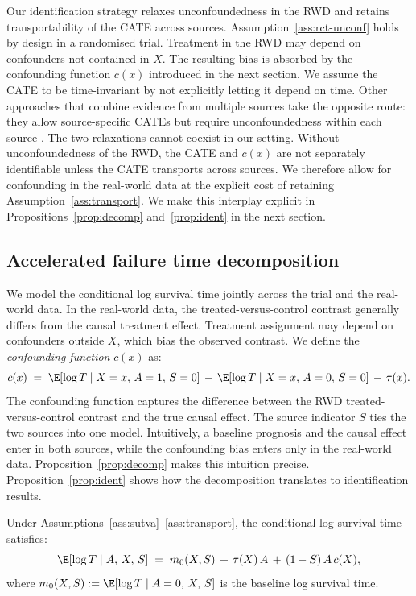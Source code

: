 Our identification strategy relaxes unconfoundedness in the RWD and retains transportability of the CATE across sources.
Assumption~\ref{ass:rct-unconf} holds by design in a randomised trial.
Treatment in the RWD may depend on confounders not contained in $X$.
The resulting bias is absorbed by the confounding function $c(x)$ introduced in the next section.
We assume the CATE to be time-invariant by not explicitly letting it depend on time.
Other approaches that combine evidence from multiple sources take the opposite route: they allow source-specific CATEs but require unconfoundedness within each source \citep{stuart2011propensity, dahabreh2019generalizing, shyr2025multistudy}.
The two relaxations cannot coexist in our setting.
Without unconfoundedness of the RWD, the CATE and $c(x)$ are not separately identifiable unless the CATE transports across sources.
We therefore allow for confounding in the real-world data at the explicit cost of retaining Assumption~\ref{ass:transport}.
We make this interplay explicit in Propositions~\ref{prop:decomp} and~\ref{prop:ident} in the next section.

\subsection{Accelerated failure time decomposition}

We model the conditional log survival time jointly across the trial and the real-world data.
In the real-world data, the treated-versus-control contrast generally differs from the causal treatment effect.
Treatment assignment may depend on confounders outside $X$, which bias the observed contrast.
We define the \emph{confounding function} $c(x)$ \citep{robins2000sensitivity} as:
\begin{equation}
c(x) \;=\; \E[\log T \mid X = x,\, A = 1,\, S = 0] \,-\, \E[\log T \mid X = x,\, A = 0,\, S = 0] \,-\, \tau(x).
\label{eq:cf}
\end{equation}
The confounding function captures the difference between the RWD treated-versus-control contrast and the true causal effect.
The source indicator $S$ ties the two sources into one model.
Intuitively, a baseline prognosis and the causal effect enter in both sources, while the confounding bias enters only in the real-world data.
Proposition~\ref{prop:decomp} makes this intuition precise.
Proposition~\ref{prop:ident} shows how the decomposition translates to identification results.
\begin{proposition}\label{prop:decomp}
Under Assumptions~\ref{ass:sutva}--\ref{ass:transport}, the conditional log survival time satisfies:
\begin{equation}
\E[\log T \mid A,\, X,\, S] \;=\; m_0(X, S) \,+\, \tau(X)\,A \,+\, (1 - S)\,A\,c(X),
\label{eq:decomp}
\end{equation}
where $m_0(X, S) := \E[\log T \mid A = 0,\, X,\, S]$ is the baseline log survival time.
\end{proposition}

